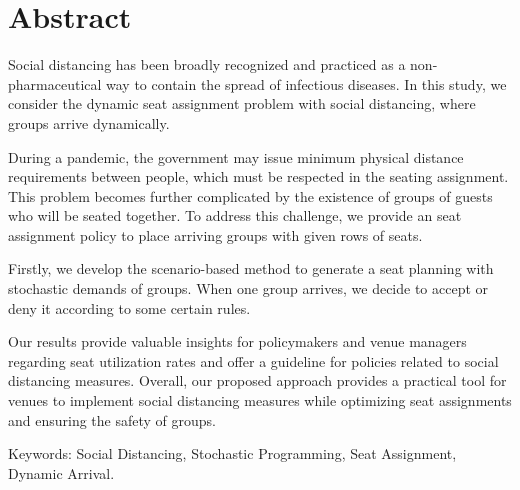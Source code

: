 
\section*{Abstract}
Social distancing has been broadly recognized and practiced as a non-pharmaceutical way to contain the spread of infectious diseases. In this study, we consider the dynamic seat assignment problem with social distancing, where groups arrive dynamically.

During a pandemic, the government may issue minimum physical distance requirements between people, which must be respected in the seating assignment. This problem becomes further complicated by the existence of groups of guests who will be seated together. To address this challenge, we provide an seat assignment policy to place arriving groups with given rows of seats.

Firstly, we develop the scenario-based method to generate a seat planning with stochastic demands of groups. When one group arrives, we decide to accept or deny it according to some certain rules.


Our results provide valuable insights for policymakers and venue managers regarding seat utilization rates and offer a guideline for policies related to social distancing measures. Overall, our proposed approach provides a practical tool for venues to implement social distancing measures while optimizing seat assignments and ensuring the safety of groups.

Keywords: Social Distancing, Stochastic Programming, Seat Assignment, Dynamic Arrival.
